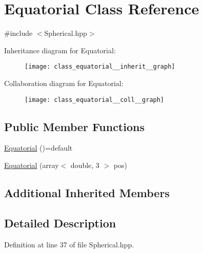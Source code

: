 \hypertarget{class_equatorial}{\section{Equatorial Class Reference}
\label{class_equatorial}
}


{\ttfamily \#include $<$Spherical.\-hpp$>$}



Inheritance diagram for Equatorial\-:\nopagebreak
\begin{figure}[H]
\begin{center}
\leavevmode
\texttt{[image: class\_equatorial\_\_inherit\_\_graph]}
\end{center}
\end{figure}


Collaboration diagram for Equatorial\-:\nopagebreak
\begin{figure}[H]
\begin{center}
\leavevmode
\texttt{[image: class\_equatorial\_\_coll\_\_graph]}
\end{center}
\end{figure}
\subsection*{Public Member Functions}
\begin{DoxyCompactItemize}
\item 
\hyperlink{class_equatorial_a8310993e702bce92cfd908751fb6d17c}{Equatorial} ()=default
\item 
\hyperlink{class_equatorial_a559465c0a50bd1d463a394eeb834bf04}{Equatorial} (array$<$ double, 3 $>$ pos)
\end{DoxyCompactItemize}
\subsection*{Additional Inherited Members}


\subsection{Detailed Description}


Definition at line 37 of file Spherical.\-hpp.



